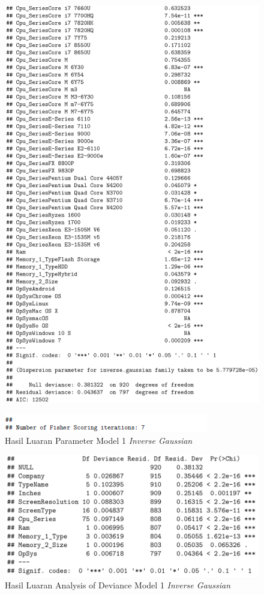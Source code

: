 \documentclass[12pt]{article}
\begin{document}
\begin{figure}[h!]
    \centering
    \includegraphics{Model_2_Sum(5_3).png}
    \label{fig:SUM25}
\end{figure}
\begin{figure}[h!]
    \centering
    \includegraphics{Model_2_Sum(6_3).png}
    \caption{Hasil Luaran Parameter Model 1 \textit{Inverse Gaussian}}
    \label{fig:SUM26}
\end{figure}
\begin{figure}[h!]
    \centering
    \includegraphics{Model_2_AOV.png}
    \caption{Hasil Luaran Analysis of Deviance Model 1 \textit{Inverse Gaussian}}
    \label{fig:AOV2}
\end{figure}
\end{document}

